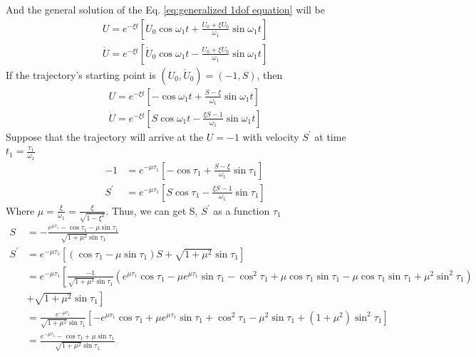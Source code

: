 \documentclass{article}
\begin{document}
 And the general solution of the Eq. \ref{eq:generalized 1dof equation} will be
 \begin{align}
     U=e^{-\xi t}\left [U_0\cos{\omega_1 t}+\frac{\dot U_0+\xi U_0}{\omega_1} \sin{\omega_1 t}  \right]\\
     \dot U=e^{-\xi t}\left[ \dot U_0 \cos{\omega_1 t}-\frac{U_0+\xi \dot U_0}{\omega_1} \sin{\omega_1 t}\right]
 \end{align}
 If the trajectory's starting point is $(U_0,\dot U_0)=(-1,S)$, then 
 \begin{align}
     U=e^{-\xi t}\left [-\cos{\omega_1 t}+\frac{S-\xi }{\omega_1} \sin{\omega_1 t}  \right]\\
     \dot U=e^{-\xi t}\left[ S \cos{\omega_1 t}-\frac{\xi S -1}{\omega_1} \sin{\omega_1 t}\right]
 \end{align}
 Suppose that the trajectory will arrive at the $U=-1$ with velocity $S^{'}$ at time $t_1=\frac{\tau_1}{\omega_1}$
 \begin{align}
     -1&=e^{-\mu \tau_1}\left [-\cos{\tau_1}+\frac{S-\xi }{\omega_1} \sin{\tau_1}  \right]\\
    S^{'}&=e^{-\mu \tau_1}\left[ S \cos{\tau_1}-\frac{\xi S -1}{\omega_1} \sin{\tau_1}\right]
 \end{align}
 Where $\displaystyle \mu = \frac{\xi}{\omega_1}=\frac{\xi}{\sqrt{1-\xi^2}}$. Thus, we can get S, $S^{'}$ as a function $\tau_1$
 \begin{align}
     S&=-\frac{e^{\mu \tau_1}-\cos{\tau_1}-\mu \sin{\tau_1}}{\sqrt{1+\mu^2}\sin{\tau_1}} \label{eq: bounding velocity}\\ \nonumber
     S^{'}&=e^{-\mu \tau_1}\left[ (\cos{\tau_1-\mu\sin{\tau_1}})S+\sqrt{1+\mu^2}\sin{\tau_1}\right]\\ \nonumber
     &=e^{-\mu \tau_1} \left[ \frac{-1}{\sqrt{1+\mu^2}\sin{\tau_1}}  (e^{\mu \tau_1}\cos{\tau_1}-\mu e^{\mu \tau_1}\sin{\tau_1}-\cos^2{\tau_1}+\mu \cos{\tau_1}\sin{\tau_1}-\mu \cos{\tau_1}\sin{\tau_1}+\mu^2\sin^2{\tau_1}) \right. \\ \nonumber 
     & +
     \left. \sqrt{1+\mu^2}\sin{\tau_1} \right]\\ \nonumber
     &=\frac{e^{-\mu \tau_1}}{\sqrt{1+\mu^2}\sin{\tau_1}}\left[ -e^{\mu \tau_1}\cos{\tau_1}+\mu e^{\mu \tau_1}\sin{\tau_1}+\cos^2{\tau_1}-\mu^2\sin{\tau_1}+(1+\mu^2)\sin^2{\tau_1}\right]\\
     &=\frac{e^{-\mu \tau_1}-\cos{\tau_1}+\mu \sin{\tau_1}}{\sqrt{1+\mu^2}\sin{\tau_1}}
     \label{eq:hitting velocity}
 \end{align}
\end{document}

